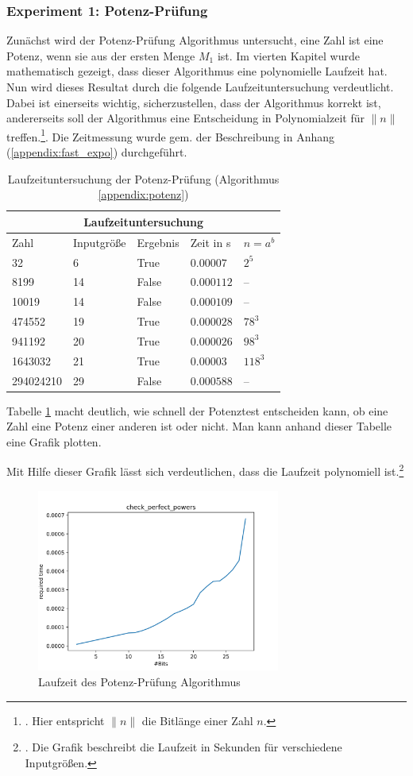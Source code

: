 \documentclass[12pt,oneside]{article}
\theoremstyle{remark}
\theoremstyle{definition}
\begin{document}
\subsubsection{Experiment 1: Potenz-Prüfung}
Zunächst wird der Potenz-Prüfung Algorithmus untersucht, eine Zahl ist eine Potenz, wenn sie aus der ersten Menge $M_1$ ist. Im vierten Kapitel wurde mathematisch gezeigt, dass dieser Algorithmus eine polynomielle Laufzeit hat. Nun wird dieses Resultat durch die folgende Laufzeituntersuchung verdeutlicht. Dabei ist einerseits wichtig, sicherzustellen, dass der Algorithmus korrekt ist, andererseits soll der Algorithmus eine Entscheidung in Polynomialzeit für $\lVert n \rVert$ treffen.\footnote{. Hier entspricht $\lVert n \rVert$ die Bitlänge einer Zahl $n$.}.
\newpage
Die Zeitmessung wurde gem. der Beschreibung in Anhang (\ref{appendix:fast_expo}) durchgeführt. 
\begin{table}[h!]
\centering
\begin{tabular}{ |p{3cm}||p{3cm}|p{3cm}|p{3cm}| |p{1.5cm}| }
 \hline
 \multicolumn{5}{|c|}{Laufzeituntersuchung} \\
 \hline
 Zahl & Inputgröße &Ergebnis&Zeit in s & $n = a^b $\\
 \hline
 32   & 6    &True&   $0.00007$& $2^5$\\
 8199&   14  & False   &$0.000112$ & --\\
 10019 &14 & False&  $0.000109$ & --\\
 474552    &19 & True&  $0.000028$ & $78^3$\\
 941192&   20  & True&$0.000026$ & $98^3$\\
 1643032& 21  & True   &$0.00003$ & $118^3$\\
 294024210& 29  & False&$0.000588$ & --\\
 \hline
\end{tabular}
 \caption{Laufzeituntersuchung der Potenz-Prüfung (Algorithmus \ref{appendix:potenz})}
\label{table:1}
\end{table}


Tabelle \ref{table:1} macht deutlich, wie schnell der Potenztest entscheiden kann, ob eine Zahl eine Potenz einer anderen ist oder nicht. Man kann anhand dieser Tabelle eine Grafik plotten. 

Mit Hilfe dieser Grafik lässt sich verdeutlichen, dass die Laufzeit polynomiell ist.\footnote{. Die Grafik beschreibt die Laufzeit in Sekunden für verschiedene Inputgrößen.\newline}
\begin{figure}[h]
\includegraphics[width=8cm]{plots/pp.png}
\centering
\caption{Laufzeit des Potenz-Prüfung Algorithmus}
\end{figure}
\end{document}
